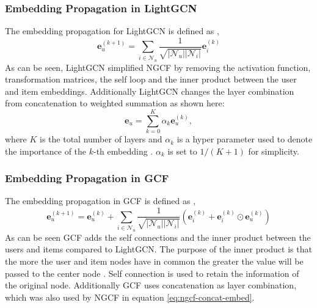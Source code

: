 \subsubsection{Embedding Propagation in LightGCN}\label{subsubsec:LightGCN-embed-propagation}
The embedding propagation for LightGCN is defined as \cite{lightgcn},
\begin{equation}
    \mathbf{e}_{u}^{(k+1)} = \sum^{}_{i \in \mathcal{N}_u} \frac{1}{\sqrt{|\mathcal{N}_u||\mathcal{N}_i|}} \mathbf{e}_i^{(k)}
\end{equation}
As can be seen, LightGCN simplified NGCF by removing the activation function, transformation matrices, the self loop and the inner product between the user and item embeddings.
Additionally LightGCN changes the layer combination from concatenation to weighted summation as shown here:
\begin{equation}
    \mathbf{e}_u = \sum_{k=0}^{K} \alpha_k \mathbf{e}_u^{(k)},
    \label{eq:lightgcn-sum}
\end{equation}
where $K$ is the total number of layers and $\alpha_k$ is a hyper parameter used to denote the importance of the $k$-th embedding \cite{lightgcn}.
$\alpha_k$ is set to $1 /(K + 1)$ for simplicity.

\subsubsection{Embedding Propagation in GCF}\label{subsubsec:GCF-embed-propagation}
The embedding propagation in GCF is defined as \cite{BiTGCF},
\begin{equation}
    \mathbf{e}_{u}^{(k+1)} = \mathbf{e}_{u}^{(k)} + \sum^{}_{i \in \mathcal{N}_u}  \frac{1}{\sqrt{|\mathcal{N}_u||\mathcal{N}_i|}}\left( \mathbf{e}_i^{(k)} + \mathbf{e}_i^{(k)} \odot \mathbf{e}_u^{(k)} \right)
    \label{eq:GCF-embedding}
\end{equation}
As can be seen GCF adds the self connections and the inner product between the users and items compared to LightGCN.
The purpose of the inner product is that the more the user and item nodes have in common the greater the value will be passed to the center node \cite{BiTGCF}.
Self connection is used to retain the information of the original node.
Additionally GCF uses concatenation as layer combination, which was also used by NGCF in equation \autoref{eq:ngcf-concat-embed}.
